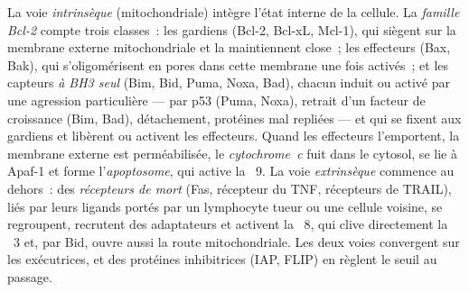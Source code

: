 \begin{definition}\label{def:b3:cell-cycle-apoptosis:pathways}
La voie \emph{intrinsèque} (mitochondriale) intègre l'état interne de
la cellule. La \emph{famille Bcl-2} compte trois classes~: les gardiens
(Bcl-2, Bcl-xL, Mcl-1), qui siègent sur la membrane externe
mitochondriale et la maintiennent close~; les effecteurs (Bax, Bak),
qui s'oligomérisent en pores dans cette membrane une fois activés~; et
les capteurs \emph{à BH3 seul} (Bim, Bid, Puma, Noxa, Bad), chacun
induit ou activé par une agression particulière ---  par
p53 (Puma, Noxa), retrait d'un facteur de croissance (Bim, Bad),
détachement, protéines mal repliées --- et qui se fixent aux gardiens
et libèrent ou activent les effecteurs. Quand les effecteurs
l'emportent, la membrane externe est perméabilisée, le
\emph{cytochrome~c} fuit dans le cytosol, se lie à Apaf-1 et forme
l'\emph{apoptosome}, qui active la ~9. La voie
\emph{extrinsèque} commence au dehors~: des \emph{récepteurs de mort}
(Fas, récepteur du TNF, récepteurs de TRAIL), liés par leurs ligands
portés par un lymphocyte tueur ou une cellule voisine, se regroupent,
recrutent des adaptateurs et activent la ~8, qui clive
directement la ~3 et, par Bid, ouvre aussi la route
mitochondriale. Les deux voies convergent sur les  exécutrices,
et des protéines inhibitrices (IAP, FLIP) en règlent le seuil au
passage.
\end{definition}

